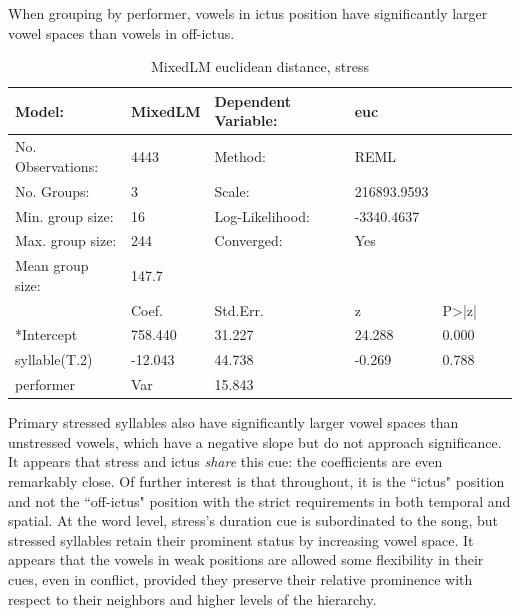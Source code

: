 \documentclass[12pt]{article}
\begin{document}
When grouping by performer, vowels in ictus position have significantly larger vowel spaces than vowels in off-ictus. 
\begin{table}
  \centering
  \begin{tabular}{@{} lllllcc @{}}
    \toprule
Model:	&MixedLM	&Dependent Variable:&	euc \\
\midrule
No. Observations:	&4443	& Method: &	REML \\
No. Groups:&	3	&  Scale: &	216893.9593 \\
Min. group size:	& 16 &	Log-Likelihood:	& -3340.4637 \\
Max. group size:	& 244	& Converged:	& Yes \\
Mean group size:	& 147.7		& \\
\midrule
& Coef. &	Std.Err.	& z &	P>|z|	 \\

*Intercept	& 758.440	 & 31.227	& 24.288	& 0.000	 \\
syllable(T.2) &	-12.043	 &44.738 &	-0.269 &	0.788	 \\
performer & Var	&15.843		& & \\
    \bottomrule
  \end{tabular}
\caption{MixedLM euclidean distance, stress}
  \label{tab:label}
\end{table}
Primary stressed syllables also have significantly larger vowel spaces than unstressed vowels, which have a negative slope but do not approach significance. It appears that stress and ictus {\it share} this cue: the coefficients are even remarkably close. Of further interest is that throughout, it is the ``ictus" position and not the ``off-ictus" position with the strict requirements in both temporal and spatial. At the word level, stress's duration cue is subordinated to the song, but stressed syllables retain their prominent status by increasing vowel space. It appears that the vowels in weak positions are allowed some flexibility in their cues, even in conflict, provided they preserve their relative prominence with respect to their neighbors and higher levels of the hierarchy. 
    \pagebreak
\end{document}
